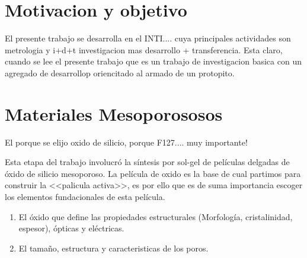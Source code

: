  






\section{Motivacion y objetivo}

El presente trabajo se desarrolla en el INTI.... cuya principales actividades son metrologia y i+d+t investigacion mas desarrollo + transferencia.
Esta claro, cuando se lee el presente trabajo que es un trabajo de investigacion basica con un agregado de desarrollop oriencitado al armado de un protopito.


\section{Materiales Mesoporososos}\label{sec:mesoporosos}

				El porque se elijo oxido de silicio, porque F127.... muy importante!
				
				Esta etapa del trabajo involucró la síntesis por sol-gel de películas delgadas de óxido de silicio mesoporoso. La película de oxido es la base de cual partimos para construir la <<palicula activa>>, es por ello que es de suma importancia escoger los elementos fundacionales de esta película. \cite{Soler-Illia2002a,Brinker1999,Soler-Illia2006,Grosso2004,Innocenzi2013}

				\begin{enumerate}
					\item El óxido que define las propiedades estructurales (Morfología, cristalinidad, espesor), ópticas y eléctricas.
					\item El tamaño, estructura y caracteristicas de los poros.
				\end{enumerate}

